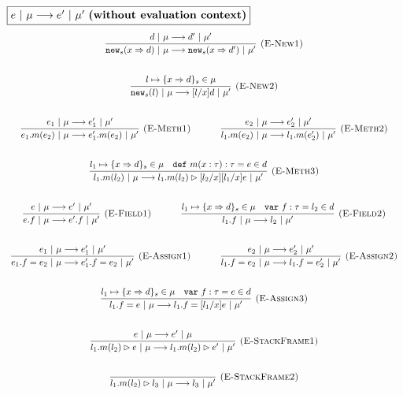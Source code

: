 \documentclass{llncs}
\newcommand{\keywadj}[1]{\mathtt{#1}}
\newcommand{\keyw}[1]{\keywadj{#1}~}
\begin{document}
\newpage

$\fbox{$e~|~\mu \longrightarrow e'~|~\mu'$ \textbf{(without evaluation context)}}$
\[
\begin{array}{c}
\infer[\textsc{(E-New1)}]
  {\keywadj{new}_{s}(x \Rightarrow d)~|~\mu \longrightarrow \keywadj{new}_{s}(x \Rightarrow d')~|~\mu'}
  {d~|~\mu \longrightarrow d'~|~\mu'}\\[5ex]

\infer[\textsc{(E-New2)}]
  {\keywadj{new}_{s}(l)~|~\mu \longrightarrow [l/x]d~|~\mu'}
  {l \mapsto \{ x \Rightarrow d \}_{s} \in \mu}\\[5ex]

\infer[\textsc{(E-Meth1)}]
  {e_1.m(e_2)~|~\mu \longrightarrow e_1'.m(e_2)~|~\mu'}
  {e_1~|~\mu \longrightarrow e_1'~|~\mu'}%
~~~~~~~~~~
\infer[\textsc{(E-Meth2)}]
  {l_1.m(e_2)~|~\mu \longrightarrow l_1.m(e_2')~|~\mu'}
  {e_2~|~\mu \longrightarrow e_2'~|~\mu'}\\[5ex]
  
\infer[\textsc{(E-Meth3)}]
  {l_1.m(l_2)~|~\mu \longrightarrow l_1.m(l_2) \rhd [l_2/x][l_1/x]e~|~\mu'}
  {l_1 \mapsto \{ x \Rightarrow d \}_{s} \in \mu & \keyw{def} m(x : \tau) : \tau = e \in d}\\[5ex]

\infer[\textsc{(E-Field1)}]
  {e.f~|~\mu \longrightarrow e'.f~|~\mu'}
  {e~|~\mu \longrightarrow e'~|~\mu'}%
~~~~~~~~~~
\infer[\textsc{(E-Field2)}]
  {l_1.f~|~\mu \longrightarrow l_2~|~\mu'}
  {l_1 \mapsto \{ x \Rightarrow d \}_{s} \in \mu & \keyw{var} f:\tau = l_2 \in d}\\[5ex]

\infer[\textsc{(E-Assign1)}]
  {e_1.f = e_2~|~\mu \longrightarrow e_1'.f = e_2~|~\mu'}
  {e_1~|~\mu \longrightarrow e_1'~|~\mu'}%
~~~~~~~~~~
\infer[\textsc{(E-Assign2)}]
  {l_1.f = e_2~|~\mu \longrightarrow l_1.f = e_2'~|~\mu'}
  {e_2~|~\mu \longrightarrow e_2'~|~\mu'}\\[5ex]

\infer[\textsc{(E-Assign3)}]
  {l_1.f = e~|~\mu \longrightarrow l_1.f = [l_1/x]e~|~\mu'}
  {l_1 \mapsto \{ x \Rightarrow d \}_{s} \in \mu & \keyw{var} f:\tau = e \in d}\\[5ex]

\infer[\textsc{(E-StackFrame1)}]
  {l_1.m(l_2) \rhd e~|~\mu \longrightarrow l_1.m(l_2) \rhd e'~|~\mu'}
  {e~|~\mu \longrightarrow e'~|~\mu}\\[5ex]

\infer[\textsc{(E-StackFrame2)}]
  {l_1.m(l_2) \rhd l_3~|~\mu \longrightarrow l_3~|~\mu'}
  {}\\[5ex]
  
\end{array}
\]
\end{document}
